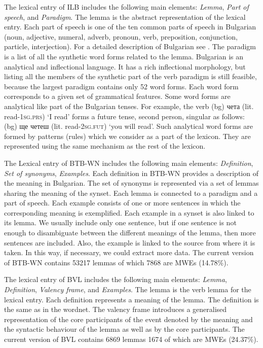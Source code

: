 \documentclass[output=paper,colorlinks,citecolor=brown]{langscibook}
\begin{document}
The lexical entry of {ILB} includes the following main elements: \emph{Lemma}, \emph{Part of speech}, and \emph{Paradigm}. The lemma is the abstract representation of the lexical entry. Each part of speech is one of the ten common parts of speech in Bulgarian (noun, adjective, numeral, adverb, pronoun, verb, preposition, conjunction, particle, interjection). For a detailed description of Bulgarian see \citet{Osenova2011}. The paradigm is a list of all the synthetic word forms related to the lemma. Bulgarian is an analytical and inflectional language. It has a rich inflectional morphology, but listing all the members of the synthetic part of the verb paradigm is still feasible, because the largest paradigm contains only 52 word forms. Each word form corresponds to a given set of grammatical features. Some word forms are analytical like part of the Bulgarian tenses. For example, the verb 
(bg) {чета }
(lit. read-\textsc{1sg.prs}) {`I read'}
forms a future tense, second person, singular as follows: 
(bg) {ще четеш }
(lit. read-\textsc{2sg.fut}) {`you will read'}.
Such analytical word forms are formed by patterns (rules) which we consider as a part of the lexicon. They are represented using the same mechanism as the rest of the lexicon. 

The Lexical entry of {BTB-WN} includes the following main elements: \emph{Definition}, \emph{Set of synonyms}, \emph{Examples}. Each definition in BTB-WN provides a description of the meaning in Bulgarian. The set of synonyms is represented via a set of lemmas sharing the meaning of the synset. Each lemma is connected to a paradigm and a part of speech. Each example consists of one or more sentences in which the corresponding meaning is exemplified. Each example in a synset is also linked to its lemma. We usually include only one sentence, but if one sentence is not enough to disambiguate between the different meanings of the lemma, then more sentences are included. Also, the example is linked to the source from where it is taken. In this way, if necessary, we could extract more data. The current version of BTB-WN contains 53217 lemmas of which 7868 are MWEs (14.78\%).

The lexical entry of {BVL} includes the following main elements: \emph{Lemma}, \emph{Definition}, \emph{Valency frame}, and \emph{Examples}. The lemma is the verb lemma for the lexical entry. Each definition represents a meaning of the lemma. The definition is the same as in the wordnet. The valency frame introduces a generalised representation of the core participants of the event denoted by the meaning and the syntactic behaviour of the lemma as well as by the core participants. The current version of BVL contains 6869 lemmas 1674 of which are MWEs (24.37\%).
\end{document}
